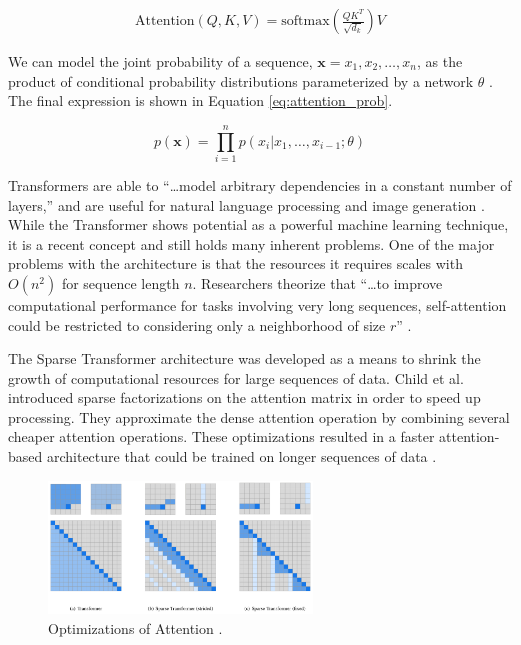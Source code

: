 \documentclass[letterpaper]{article} %
\begin{document}
\begin{equation}
\label{eq:attention}
\begin{split}
\text{Attention}(Q,K,V) = \text{softmax}(\frac{QK^T}{\sqrt{d_k}})V
\end{split}
\end{equation}

We can model the joint probability of a sequence,
$\mathbf{x}={x_1,x_2,\dots,x_n}$,
as the product of conditional
probability distributions parameterized by a network $\theta$
\cite{generative_transformers}.
The final expression is shown in Equation \ref{eq:attention_prob}.

\begin{equation}
\label{eq:attention_prob}
p(\mathbf{x}) = \prod_{i=1}^{n}p(x_i|x_1,\dots,x_{i-1};\theta)
\end{equation}

Transformers are able to
``\dots model arbitrary dependencies
in a constant number of layers,''
and are useful for natural language processing and image generation
\cite{generative_transformers}.
While the Transformer shows potential as a powerful machine learning technique,
it is a recent concept and still holds many inherent problems.
One of the major problems with the architecture
is that the resources it requires scales with $O(n^2)$
for sequence length $n$. Researchers theorize that
``\dots to improve computational performance for tasks involving very long sequences,
self-attention could be restricted to considering only a neighborhood of size $r$''
\cite{attention_need}.

The Sparse Transformer architecture was developed as a means to shrink the
growth of computational resources for large sequences of data.
Child et al. introduced sparse factorizations on the attention matrix
in order to speed up processing.
They approximate the dense attention
operation by combining several cheaper attention operations.
These optimizations resulted in a faster attention-based architecture
that could be trained on longer sequences of data \cite{generative_transformers}.

\begin{figure}[htbp]
\centerline{\includegraphics[width=7cm]{attention_comparison.png}}
\caption{Optimizations of Attention
\cite{generative_transformers}.}
\label{fig:attention_optimization}
\end{figure}
\end{document}
